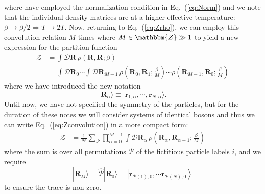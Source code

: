 \documentclass[prb,10pt,aps,floatfix,notitlepage]{revtex4-1}
\renewcommand{\vec}[1]{\boldsymbol{#1}}
\renewcommand{\eqref}[1]{Eq.~(\ref{#1})}
\newcommand{\R}{\vec{R}}
\begin{document}
%
where have employed the normalization condition in \eqref{eq:Norm} and
we note that the individual density matrices are at a higher effective
temperature: $\beta \to \beta/2 \Rightarrow T \to 2 T$. Now, returning to
\eqref{eq:Zrho}, we can employ this convolution relation $M$ times where $M \in
\mathbbm{Z} \gg 1$ to yield a new expression for the partition function
%
\begin{align}
    \mathcal{Z}  &= \int \mathcal{D}\R\, \rho(\R,\R;\beta) \nonumber \\
                 &= \int \mathcal{D}\R_0 \cdots \int \mathcal{D}\R_{M-1}\,
    \rho\left(\R_0,\R_{1};\frac{\beta}{M}\right) \cdots
    \rho\left(\R_{M-1},\R_{0};\frac{\beta}{M}\right)
    \label{eq:Zconvolution}
\end{align}
%
where we have introduced the new notation
%
\begin{equation}
    |\R_\alpha\rangle \equiv |\vec{r}_{1,\alpha}, \cdots, \vec{r}_{N,\alpha}
    \rangle.
\end{equation}
%
Until now, we have not specified the symmetry of the particles, but for the
duration of these notes we will consider systems of identical bosons and thus
we can write \eqref{eq:Zconvolution} in a more compact form:
%
\begin{align}
    \mathcal{Z}  &= \frac{1}{N!}\sum_{\mathcal{P}} 
    \prod_{\alpha=0}^{M-1}\int \mathcal{D}\R_\alpha\,
    \rho\left(\R_\alpha,\R_{\alpha+1};\frac{\beta}{M}\right)
    \label{eq:Zpermute}
\end{align}
%
where the sum is over all permutations $\mathcal{P}$ of the fictitious particle
labels $i$, and we require
%
\begin{equation}
    |\R_M\rangle = \hat{\mathcal{P}} |\R_0\rangle =
    \left|\vec{r}_{\mathcal{P}(1),0}, \cdots \vec{r}_{\mathcal{P}(N),0} \right \rangle
\end{equation}
%
to ensure the trace is non-zero.
\end{document}
